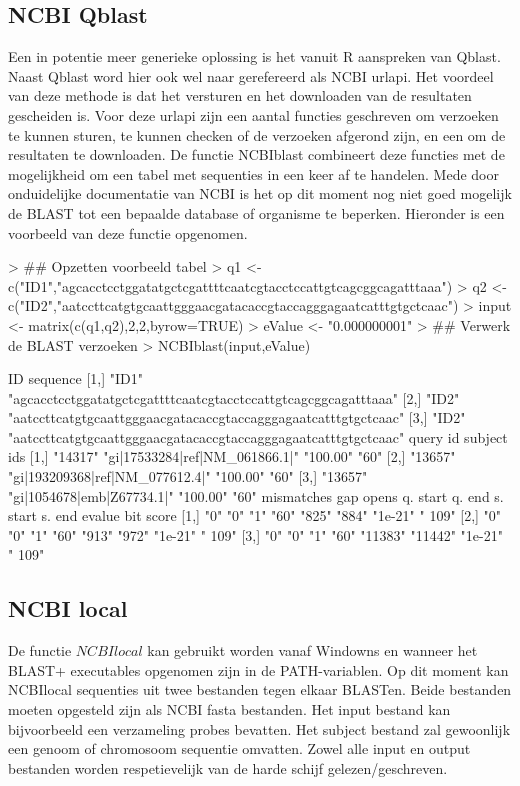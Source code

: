 \documentclass[10pt]{article}
\begin{document}
\subsection*{NCBI Qblast}
Een in potentie meer generieke oplossing is het vanuit R aanspreken van Qblast\cite{qblast}. Naast Qblast word hier ook wel naar gerefereerd als NCBI urlapi. Het voordeel van deze methode is dat het versturen en het downloaden van de resultaten gescheiden is. Voor deze urlapi zijn een aantal functies geschreven om verzoeken te kunnen sturen, te kunnen checken of de verzoeken afgerond zijn, en een om de resultaten te downloaden. De functie NCBIblast combineert deze functies met de mogelijkheid om een tabel met sequenties in een keer af te handelen. Mede door onduidelijke documentatie van NCBI is het op dit moment nog niet goed mogelijk de BLAST tot een bepaalde database of organisme te beperken. Hieronder is een voorbeeld van deze functie opgenomen.
\begin{Schunk}
\begin{Sinput}
> ## Opzetten voorbeeld tabel
> q1 <- c("ID1","agcacctcctggatatgctcgattttcaatcgtacctccattgtcagcggcagatttaaa")
> q2 <- c("ID2","aatccttcatgtgcaattgggaacgatacaccgtaccagggagaatcatttgtgctcaac")
> input <- matrix(c(q1,q2),2,2,byrow=TRUE)
> eValue <- "0.000000001"
> ## Verwerk de BLAST verzoeken
> NCBIblast(input,eValue)
\end{Sinput}
\begin{Soutput}
     ID    sequence                                                      
[1,] "ID1" "agcacctcctggatatgctcgattttcaatcgtacctccattgtcagcggcagatttaaa"
[2,] "ID2" "aatccttcatgtgcaattgggaacgatacaccgtaccagggagaatcatttgtgctcaac"
[3,] "ID2" "aatccttcatgtgcaattgggaacgatacaccgtaccagggagaatcatttgtgctcaac"
     query id subject ids                     % identity alignment length
[1,] "14317"  "gi|17533284|ref|NM_061866.1|"  "100.00"   "60"            
[2,] "13657"  "gi|193209368|ref|NM_077612.4|" "100.00"   "60"            
[3,] "13657"  "gi|1054678|emb|Z67734.1|"      "100.00"   "60"            
     mismatches gap opens q. start q. end s. start s. end  evalue  bit score
[1,] "0"        "0"       "1"      "60"   "825"    "884"   "1e-21" " 109"   
[2,] "0"        "0"       "1"      "60"   "913"    "972"   "1e-21" " 109"   
[3,] "0"        "0"       "1"      "60"   "11383"  "11442" "1e-21" " 109"   
\end{Soutput}
\end{Schunk}

\subsection*{NCBI local}
De functie $NCBIlocal$ kan gebruikt worden vanaf Windowns en wanneer het BLAST+ executables opgenomen zijn in de PATH-variablen. Op dit moment kan NCBIlocal sequenties uit twee bestanden tegen elkaar BLASTen. Beide bestanden moeten opgesteld zijn als NCBI fasta bestanden\cite{NCBIfasta}. Het input bestand kan bijvoorbeeld een verzameling probes bevatten. Het subject bestand zal gewoonlijk een genoom of chromosoom sequentie omvatten. Zowel alle input en output bestanden worden respetievelijk van de harde schijf gelezen/geschreven.
\end{document}
